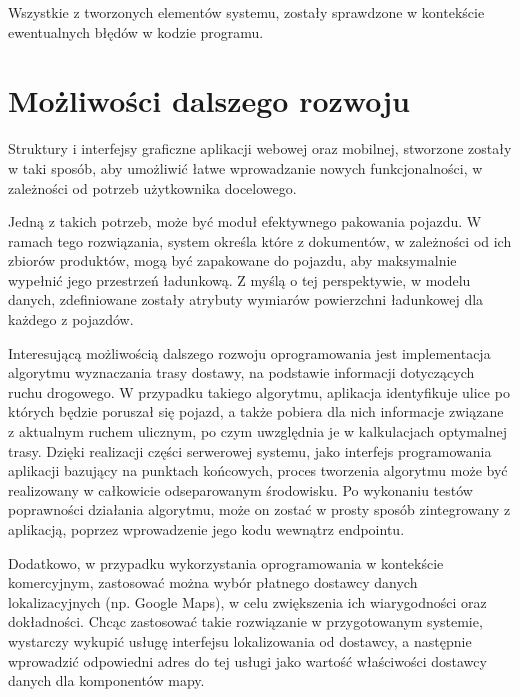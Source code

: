 Wszystkie z tworzonych elementów systemu, zostały sprawdzone w kontekście ewentualnych błędów w kodzie programu. 
\newpage
\section{Możliwości dalszego rozwoju}
Struktury i interfejsy graficzne aplikacji webowej oraz mobilnej, stworzone zostały w taki sposób, aby umożliwić łatwe wprowadzanie nowych funkcjonalności, w zależności od potrzeb użytkownika docelowego.

Jedną z takich potrzeb, może być moduł efektywnego pakowania pojazdu. W ramach tego rozwiązania, system określa które z dokumentów, w zależności od ich zbiorów produktów, mogą być zapakowane do pojazdu, aby maksymalnie wypełnić jego przestrzeń ładunkową. Z myślą o tej perspektywie, w modelu danych, zdefiniowane zostały atrybuty wymiarów powierzchni ładunkowej dla każdego z pojazdów.

Interesującą możliwością dalszego rozwoju oprogramowania jest implementacja algorytmu wyznaczania trasy dostawy, na podstawie informacji dotyczących ruchu drogowego. W przypadku takiego algorytmu, aplikacja identyfikuje ulice po których będzie poruszał się pojazd, a także pobiera dla nich informacje związane z aktualnym ruchem ulicznym, po czym uwzględnia je w kalkulacjach optymalnej trasy. Dzięki realizacji części serwerowej systemu, jako interfejs programowania aplikacji bazujący na punktach końcowych, proces tworzenia algorytmu może być realizowany w całkowicie odseparowanym środowisku. Po wykonaniu testów poprawności działania algorytmu, może on zostać w prosty sposób zintegrowany z aplikacją, poprzez wprowadzenie jego kodu wewnątrz endpointu.  

Dodatkowo, w przypadku wykorzystania oprogramowania w kontekście komercyjnym, zastosować można wybór płatnego dostawcy danych lokalizacyjnych (np. Google Maps), w celu zwiększenia ich wiarygodności oraz dokładności. Chcąc zastosować takie rozwiązanie w przygotowanym systemie, wystarczy wykupić usługę interfejsu lokalizowania od dostawcy, a następnie wprowadzić odpowiedni adres do tej usługi jako wartość właściwości dostawcy danych dla komponentów mapy.